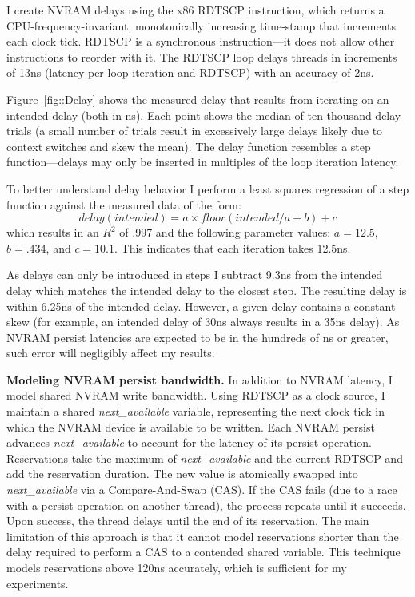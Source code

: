 I create NVRAM delays using the x86 RDTSCP instruction, which returns a CPU-frequency-invariant, monotonically increasing time-stamp that increments each clock tick.
RDTSCP is a synchronous instruction---it does not allow other instructions to reorder with it.
The RDTSCP loop delays threads in increments of 13ns (latency per loop iteration and RDTSCP) with an accuracy of 2ns.


Figure~\ref{fig::Delay} shows the measured delay that results from iterating on an intended delay (both in ns).
Each point shows the median of ten thousand delay trials (a small number of trials result in excessively large delays likely due to context switches and skew the mean).
The delay function resembles a step function---delays may only be inserted in multiples of the loop iteration latency.

To better understand delay behavior I perform a least squares regression of a step function against the measured data of the form:
$$delay(intended) = a \times floor(intended / a + b) + c$$
which results in an $R^2$ of .997 and the following parameter values: $a = 12.5$, $b=.434$, and $c=10.1$.
This indicates that each iteration takes 12.5ns.

As delays can only be introduced in steps I subtract 9.3ns from the intended delay which matches the intended delay to the closest step.
The resulting delay is within 6.25ns of the intended delay.
However, a given delay contains a constant skew (for example, an intended delay of 30ns always results in a 35ns delay).
As NVRAM persist latencies are expected to be in the hundreds of ns or greater, such error will negligibly affect my results.


\textbf{Modeling NVRAM persist bandwidth.}
In addition to NVRAM latency, I model shared NVRAM write bandwidth.
Using RDTSCP as a clock source, I maintain a shared \emph{next\_available} variable, representing the next clock tick in which the NVRAM device is available to be written.
Each NVRAM persist advances \emph{next\_available} to account for the latency of its persist operation.
Reservations take the maximum of \emph{next\_available} and the current RDTSCP and add the reservation duration.
The new value is atomically swapped into \emph{next\_available} via a Compare-And-Swap (CAS).
If the CAS fails (due to a race with a persist operation on another thread), the process repeats until it succeeds.
Upon success, the thread delays until the end of its reservation.
The main limitation of this approach is that it cannot model reservations shorter than the delay required to perform a CAS to a contended shared variable.
This technique models reservations above 120ns accurately, which is sufficient for my experiments.

